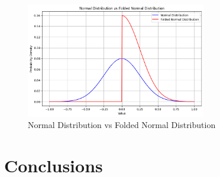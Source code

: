 \documentclass[11pt]{article}
\numberwithin{equation}{section}
\theoremstyle{boldStyle}
\begin{document}
\begin{figure}[H]
    \centering
    \includegraphics[width=0.7\textwidth]{figs/Normal Distribution_vs_Folded_Normal_Distribution.png}
    \caption{Normal Distribution vs Folded Normal Distribution}
    \label{fig:folded_normal_distribution}
\end{figure}












\newpage


\section{Conclusions}
\end{document}
